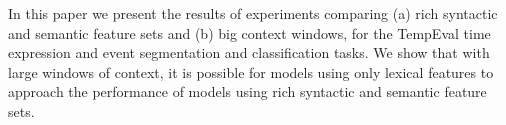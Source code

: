 In this paper we present the results of experiments comparing (a) rich syntactic and semantic feature sets and (b) big context windows, for the
 TempEval time expression and event segmentation and classification tasks.  We
 show that with large windows of context, it is possible for models using only
 lexical features to approach the performance of models using rich syntactic and
 semantic feature sets.

